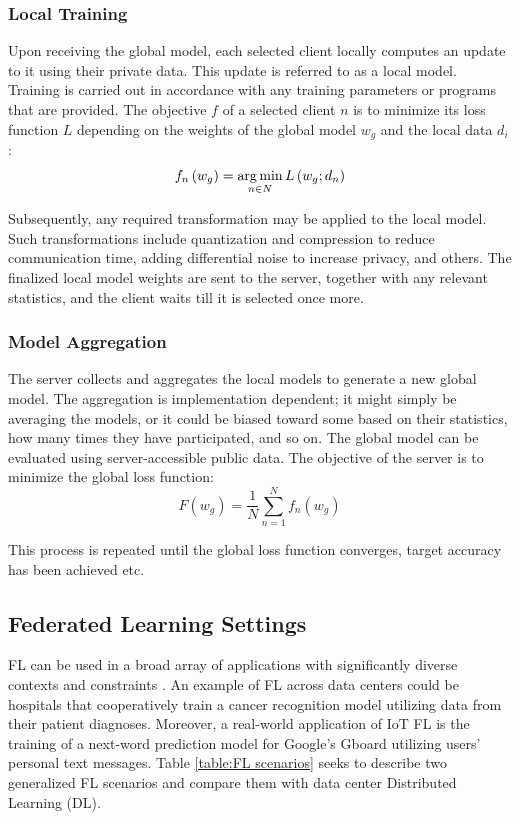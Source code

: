\subsubsection{Local Training} %
Upon receiving the global model, each selected client locally computes an update to it using their private data. This update is referred to as a local model. Training is carried out in accordance with any training parameters or programs that are provided. The objective \(f\) of a selected client \(n\) is to minimize its loss function \(L\) depending on the weights of the global model \(w_g\) and the local data \(d_i\):
\begin{equation}
    f_n \left( w_g \right) = \operatorname*{arg\,min}_{n\in N} L\left( w_g ; d_n \right)
	\label{eqn:FL, Objective of a selected client}
\end{equation}

Subsequently, any required transformation may be applied to the local model. Such transformations include quantization and compression to reduce communication time, adding differential noise to increase privacy, and others. The finalized local model weights are sent to the server, together with any relevant statistics, and the client waits till it is selected once more.

\subsubsection{Model Aggregation} %
The server collects and aggregates the local models to generate a new global model. The aggregation is implementation dependent; it might simply be averaging the models, or it could be biased toward some based on their statistics, how many times they have participated, and so on. The global model can be evaluated using server-accessible public data. The objective of the server is to minimize the global loss function:
\begin{equation}
    F \left( w_g \right) = \frac{1}{N} \sum_{n=1}^N f_n \left( w_g \right)
	\label{eqn:FL, Objective of the server}
\end{equation}

This process is repeated until the global loss function converges, target accuracy has been achieved etc.

\subsection{Federated Learning Settings} %
FL can be used in a broad array of applications with significantly diverse contexts and constraints \cite{survey_B, survey_D}. An example of FL across data centers could be hospitals that cooperatively train a cancer recognition model utilizing data from their patient diagnoses. Moreover, a real-world application of IoT FL is the training of a next-word prediction model for Google's Gboard \cite{GBoard_FL} utilizing users' personal text messages. Table \ref{table:FL scenarios} seeks to describe two generalized FL scenarios and compare them with data center Distributed Learning (DL).

